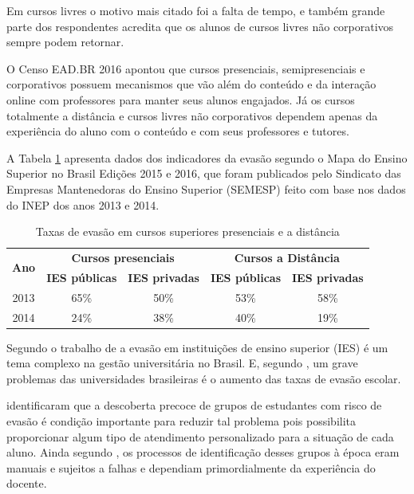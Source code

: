 Em cursos livres o motivo mais citado foi a falta de tempo, e também grande
parte dos respondentes acredita que os alunos de cursos livres não corporativos
sempre podem retornar.

O Censo EAD.BR 2016 apontou que cursos presenciais, semipresenciais e
corporativos possuem mecanismos que vão além do conteúdo e da interação online
com professores para manter seus alunos engajados. Já os cursos totalmente a
distância e cursos livres não corporativos dependem apenas da experiência do
aluno com o conteúdo e com seus professores e tutores.

A Tabela \ref{tableEvasionTax2} apresenta dados dos indicadores da evasão
segundo o Mapa do Ensino Superior no Brasil Edições 2015 e 2016, que foram
publicados pelo Sindicato das Empresas Mantenedoras do Ensino Superior (SEMESP)
feito com base nos dados do INEP dos anos 2013 e 2014.

\begin{table}[!htb]
  \centering
  \caption{\label{tableEvasionTax2} Taxas de evasão em cursos superiores presenciais e a distância}
  \begin{tabular}{@{}ccccc@{}}
    \toprule
    \multirow{2}{*}{\textbf{Ano}} & \multicolumn{2}{c}{\textbf{Cursos presenciais}} & \multicolumn{2}{c}{\textbf{Cursos a Distância}} \\ \cmidrule(l){2-5}
    & \textbf{IES públicas} & \textbf{IES privadas} & \textbf{IES públicas} & \textbf{IES privadas} \\ \midrule
    2013 & 65\% & 50\% & 53\% & 58\% \\
    2014 & 24\% & 38\% & 40\% & 19\% \\ \bottomrule
  \end{tabular}
\end{table}

Segundo o trabalho de  a
evasão em instituições de ensino superior (IES) é um tema complexo na gestão
universitária no Brasil. E, segundo
, um grave problemas das
universidades brasileiras é o aumento das taxas de evasão escolar.

 identificaram que a descoberta precoce de
grupos de estudantes com risco de evasão é condição importante para reduzir tal
problema pois possibilita proporcionar algum tipo de atendimento personalizado
para a situação de cada aluno. Ainda segundo
, os processos de identificação desses
grupos à época eram manuais e sujeitos a falhas e dependiam primordialmente da
experiência do docente.

